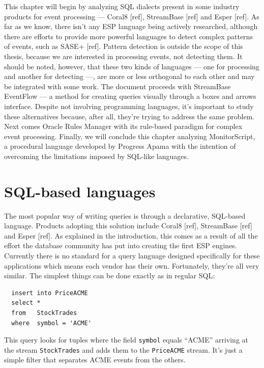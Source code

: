 \documentclass{report}
\begin{document}
This chapter will begin by analyzing SQL dialects present in some
industry products for event processing --- Coral8 [ref], StreamBase
[ref] and Esper [ref]. As far as we know, there isn't any ESP language
being actively researched, although there are efforts to provide more
powerful languages to detect complex patterns of events, such as SASE+
[ref]. Pattern detection is outside the scope of this thesis, because
we are interested in processing events, not detecting them. It should
be noted, however, that these two kinds of languages --- one for
processing and another for detecting ---, are more or less orthogonal
to each other and may be integrated with some work. The document
proceeds with StreamBase EventFlow --- a method for creating queries
visually through a boxes and arrows interface. Despite not involving
programming languages, it's important to study these alternatives
because, after all, they're trying to address the same problem. Next
comes Oracle Rules Manager with its rule-based paradigm for complex
event processing. Finally, we will conclude this chapter analyzing
MonitorScript, a procedural language developed by Progress Apama with
the intention of overcoming the limitations imposed by SQL-like
languages.

\section{SQL-based languages}
\label{sec:sql}

The most popular way of writing queries is through a declarative,
SQL-based language. Products adopting this solution include Coral8
[ref], StreamBase [ref] and Esper [ref]. As explained in the
introduction, this comes as a result of all the effort the database
community has put into creating the first ESP engines. Currently there
is no standard for a query language designed specifically for these
applications which means each vendor has their own. Fortunately,
they're all very similar. The simplest things can be done exactly as
in regular SQL:

\lstset{
  language=CCL,
  columns=fullflexible,
  basicstyle=\tt,
  keywordstyle=[1]\bf,
  keywordstyle=[2]\it,
}

\begin{lstlisting}
  insert into PriceACME
  select *
  from   StockTrades
  where  symbol = 'ACME'
\end{lstlisting}


This query looks for tuples where the field \verb=symbol= equals
``ACME'' arriving at the stream \verb=StockTrades= and adds them to
the \verb=PriceACME= stream. It's just a simple filter that separates
ACME events from the others.
\end{document}

